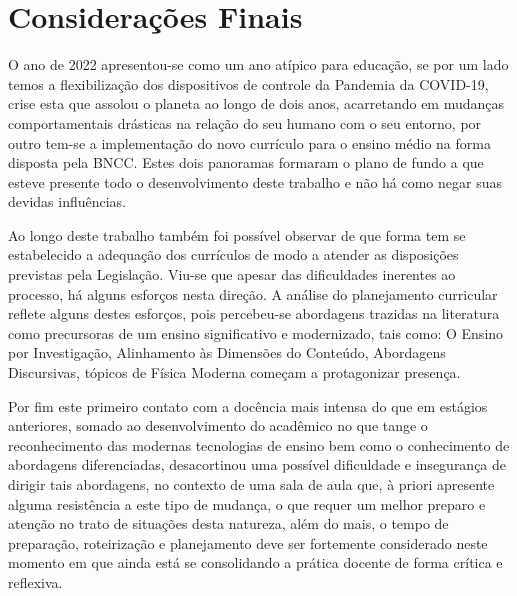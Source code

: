 \chapter{Considerações Finais}
O ano de 2022 apresentou-se como um ano atípico para educação, se por um lado temos a flexibilização dos dispositivos de controle da Pandemia da COVID-19, crise esta que assolou o planeta ao longo de dois anos, acarretando em mudanças comportamentais drásticas na relação do seu humano com o seu entorno, por outro tem-se a implementação do novo currículo para o ensino médio na forma disposta pela \ac{BNCC}. Estes dois panoramas formaram o plano de fundo a que esteve presente todo o desenvolvimento deste trabalho e não há como negar suas devidas influências.

Ao longo deste trabalho também foi possível observar de que forma tem se estabelecido a adequação dos currículos de modo a atender as disposições previstas pela Legislação. Viu-se que apesar das dificuldades inerentes ao processo, há alguns esforços nesta direção. A análise do planejamento curricular reflete alguns destes esforços, pois percebeu-se abordagens trazidas na literatura como precursoras de um ensino significativo e modernizado, tais como: O Ensino por Investigação, Alinhamento às Dimensões do Conteúdo, Abordagens Discursivas, tópicos de Física Moderna começam a protagonizar presença.

Por fim este primeiro contato com a docência mais intensa do que em estágios anteriores, somado ao desenvolvimento do acadêmico no que tange o reconhecimento das modernas tecnologias de ensino bem como o conhecimento de abordagens diferenciadas, desacortinou uma possível dificuldade e insegurança de dirigir tais abordagens, no contexto de uma sala de aula que, à priori apresente alguma resistência a este tipo de mudança, o que requer um melhor preparo e atenção no trato de situações desta natureza, além do mais, o tempo de preparação, roteirização e planejamento deve ser fortemente considerado neste momento em que ainda está se consolidando a prática docente de forma crítica e reflexiva.